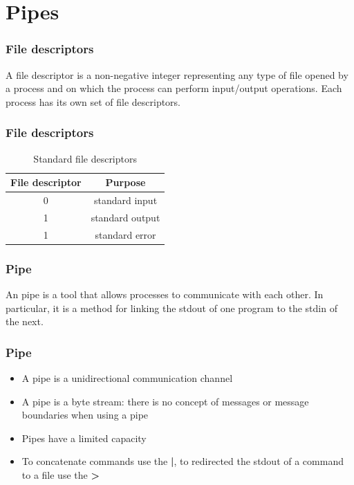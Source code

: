 \documentclass{beamer}
\begin{document}
\section{Pipes}

\begin{frame}
\frametitle{File descriptors}
\begin{definition}
A \alert{file descriptor} is a non-negative integer representing any type of file opened by a process and on which the process can perform input/output operations. Each process has its own set of file descriptors.
\end{definition}
\end{frame}

\begin{frame}
\frametitle{File descriptors}
\begin{table}[!h]
\begin{center}
\begin{tabular}{ cc } 
\hline
File descriptor & Purpose \\
\hline
0 & standard input \\
1 & standard output \\
1 & standard error \\
\hline
\end{tabular}
\caption{Standard file descriptors}
\end{center}
\end{table}
\end{frame}

\begin{frame}
\frametitle{Pipe}
\begin{definition}
An \alert{pipe} is a tool that allows processes to communicate with each other. In particular, it is a method for linking the stdout of one program to the stdin of the next.
\end{definition}
\end{frame}

\begin{frame}
\frametitle{Pipe}
\begin{itemize}
\item A pipe is a unidirectional communication channel
\item A pipe is a byte stream: there is no concept of messages or message boundaries when using a pipe
\item Pipes have a limited capacity
\item To concatenate commands use the \textbf{|}, to redirected the stdout of a command to a file use the \textbf{>}
\end{itemize}
\end{frame}
\end{document}
